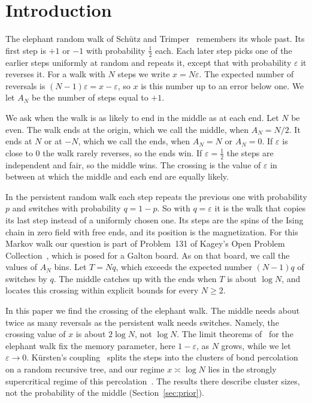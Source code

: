 \section{Introduction}\label{sec:intro}

The elephant random walk of Sch\"utz and Trimper~\cite{schutz2004} remembers
its whole past. Its first step is $+1$ or $-1$ with probability $\frac12$
each. Each later step picks one of the earlier steps uniformly at random and
repeats it, except that with probability $\varepsilon$ it reverses it. For a
walk with $N$ steps we write $x=N\varepsilon$. The expected number of
reversals is $(N-1)\varepsilon=x-\varepsilon$, so $x$ is this number up to an
error below one. We let $A_N$ be the number of steps equal to $+1$.

We ask when the walk is as likely to end in the middle as at each end. Let $N$
be even. The walk ends at the origin, which we call the middle, when
$A_N=N/2$. It ends at $N$ or at $-N$, which we call the ends, when $A_N=N$ or
$A_N=0$. If $\varepsilon$ is close to 0 the walk rarely reverses, so the ends
win. If $\varepsilon=\frac12$ the steps are independent and fair, so the
middle wins. The crossing is the value of $\varepsilon$ in between at which the
middle and each end are equally likely.

In the persistent random walk each step repeats the previous one with
probability $p$ and switches with probability $q=1-p$. So with $q=\varepsilon$
it is the walk that copies its last step instead of a uniformly chosen one.
Its steps are the spins of the Ising chain in zero field with free ends, and
its position is the magnetization. For this Markov walk our question is part
of Problem~131 of Kagey's Open Problem Collection~\cite{kagey131}, which is
posed for a Galton board. As on that board, we call the values of $A_N$ bins.
Let $T=Nq$, which exceeds the expected number $(N-1)q$ of switches by $q$. The middle catches
up with the ends when $T$ is about $\log N$, and~\cite{paperA} locates this
crossing within explicit bounds for every $N\ge2$.

In this paper we find the crossing of the elephant walk. The middle needs
about twice as many reversals as the persistent walk needs switches. Namely,
the crossing value of $x$ is about $2\log N$, not $\log N$. The limit theorems
of~\cite{glrs2025,tv2026} for the elephant walk fix the memory parameter, here
$1-\varepsilon$, as $N$ grows, while we let $\varepsilon\to0$. K\"ursten's
coupling~\cite{kursten2016} splits the steps into the clusters of bond
percolation on a random recursive tree, and our regime $x\asymp\log N$ lies in
the strongly supercritical regime of this
percolation~\cite{baur2016}. The results there describe cluster
sizes, not the probability of the middle (Section~\ref{sec:prior}).

